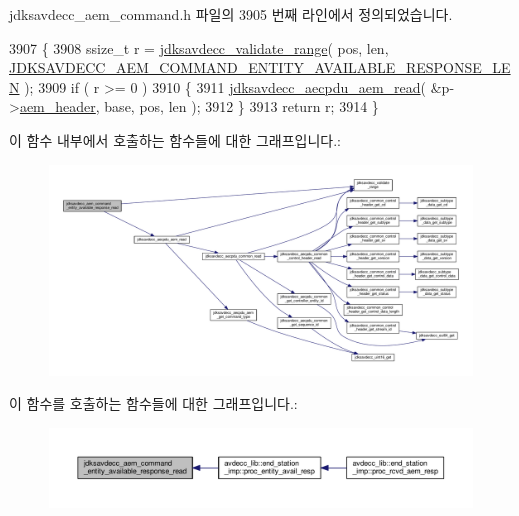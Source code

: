 jdksavdecc\+\_\+aem\+\_\+command.\+h 파일의 3905 번째 라인에서 정의되었습니다.


\begin{DoxyCode}
3907 \{
3908     ssize\_t r = \hyperlink{group__util_ga9c02bdfe76c69163647c3196db7a73a1}{jdksavdecc\_validate\_range}( pos, len, 
      \hyperlink{group__command__entity__available__response_gac62890c7584a06eb4c3e18d082690e5b}{JDKSAVDECC\_AEM\_COMMAND\_ENTITY\_AVAILABLE\_RESPONSE\_LEN} );
3909     \textcolor{keywordflow}{if} ( r >= 0 )
3910     \{
3911         \hyperlink{group__aecpdu__aem_gae2421015dcdce745b4f03832e12b4fb6}{jdksavdecc\_aecpdu\_aem\_read}( &p->\hyperlink{structjdksavdecc__aem__command__entity__available__response_ae1e77ccb75ff5021ad923221eab38294}{aem\_header}, base, pos, len );
3912     \}
3913     \textcolor{keywordflow}{return} r;
3914 \}
\end{DoxyCode}


이 함수 내부에서 호출하는 함수들에 대한 그래프입니다.\+:
\nopagebreak
\begin{figure}[H]
\begin{center}
\leavevmode
\includegraphics[width=350pt]{group__command__entity__available__response_gabde2ccc31e53407a8978e67880226568_cgraph}
\end{center}
\end{figure}




이 함수를 호출하는 함수들에 대한 그래프입니다.\+:
\nopagebreak
\begin{figure}[H]
\begin{center}
\leavevmode
\includegraphics[width=350pt]{group__command__entity__available__response_gabde2ccc31e53407a8978e67880226568_icgraph}
\end{center}
\end{figure}


